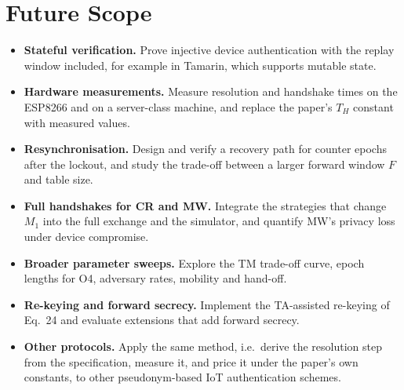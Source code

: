 \section{Future Scope}
\begin{itemize}
\item \textbf{Stateful verification.} Prove injective device authentication with the replay window included, for example in Tamarin, which supports mutable state.
\item \textbf{Hardware measurements.} Measure resolution and handshake times on the ESP8266 and on a server-class machine, and replace the paper's $T_H$ constant with measured values.
\item \textbf{Resynchronisation.} Design and verify a recovery path for counter epochs after the lockout, and study the trade-off between a larger forward window $F$ and table size.
\item \textbf{Full handshakes for CR and MW.} Integrate the strategies that change $M_1$ into the full exchange and the simulator, and quantify MW's privacy loss under device compromise.
\item \textbf{Broader parameter sweeps.} Explore the TM trade-off curve, epoch lengths for O4, adversary rates, mobility and hand-off.
\item \textbf{Re-keying and forward secrecy.} Implement the TA-assisted re-keying of Eq.~24 and evaluate extensions that add forward secrecy.
\item \textbf{Other protocols.} Apply the same method, i.e.\ derive the resolution step from the specification, measure it, and price it under the paper's own constants, to other pseudonym-based IoT authentication schemes.
\end{itemize}

